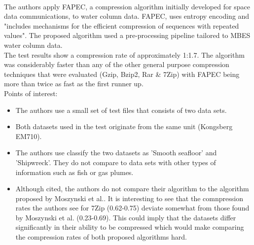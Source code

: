 \cite{amblasreal}\\
The authors apply FAPEC, a compression algorithm initially developed for space data communications, to water column data. FAPEC, uses entropy encoding and "includes mechanisms for the efficient compression of sequences with repeated values". The proposed algorithm used a pre-processing pipeline tailored to MBES water column data.\\
The test results show a compression rate of approximately 1:1.7. The algorithm was considerably faster than any of the other general purpose compression techniques that were evaluated (Gzip, Bzip2, Rar \& 7Zip) with FAPEC being more than twice as fast as the first runner up. 
\\
Points of interest:\\
\begin{itemize}
\item The authors use a small set of test files that consists of two data sets.
\item Both datasets used in the test originate from the same unit (Kongsberg EM710). 
\item The authors use classify the two datasets as 'Smooth seafloor' and 'Shipwreck'. They do not compare to data sets with other types of information such as fish or gas plumes.
\item Although cited, the authors do not compare their algorithm to the algorithm proposed by Moszynski et al.\cite{moszynski2013novel}. It is interesting to see that the comnpression rates the authors see for 7Zip (0.62-0.75) deviate somewhat from those found by Moszynski et al.\cite{moszynski2013novel} (0.23-0.69). This could imply that the datasets differ significantly in their ability to be compressed which would make comparing the compression rates of both proposed algorithms hard. 
\end{itemize}